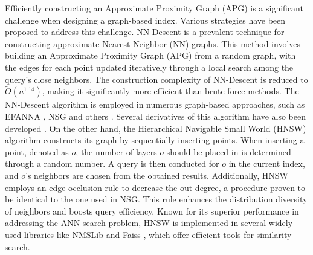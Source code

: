 \documentclass[11pt]{article}
\begin{document}
Efficiently constructing an Approximate Proximity Graph (APG) is a significant challenge when designing a graph-based index. Various strategies have been proposed to address this challenge. 
NN-Descent is a prevalent technique for constructing approximate Nearest Neighbor (NN) graphs. This method involves building an Approximate Proximity Graph (APG) from a random graph, with the edges for each point updated iteratively through a local search among the query's close neighbors. The construction complexity of NN-Descent is reduced to $\tilde{O}(n^{1.14})$, making it significantly more efficient than brute-force methods. The NN-Descent algorithm is employed in numerous graph-based approaches, such as EFANNA \cite{DBLP:journals/corr/FuC16}, NSG \cite{DBLP:journals/pvldb/FuXWC19} and others \cite{DBLP:journals/corr/abs-1804-03032,DBLP:journals/corr/abs-1908-00814}. Several derivatives of this algorithm have also been developed \cite{DBLP:conf/wims/BraticHKOR18}.
On the other hand, the Hierarchical Navigable Small World (HNSW) algorithm constructs its graph by sequentially inserting points. When inserting a point, denoted as $o$, the number of layers $o$ should be placed in is determined through a random number. A query is then conducted for $o$ in the current index, and $o$'s neighbors are chosen from the obtained results. Additionally, HNSW employs an edge occlusion rule to decrease the out-degree, a procedure proven to be identical to the one used in NSG. This rule enhances the distribution diversity of neighbors and boosts query efficiency. Known for its superior performance in addressing the ANN search problem, HNSW is implemented in several widely-used libraries like NMSLib \cite{nmslib} and Faiss \cite{faiss}, which offer efficient tools for similarity search.
\end{document}
